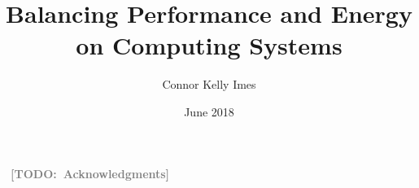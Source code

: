 \documentclass{ucetd}
\title{Balancing Performance and Energy on Computing Systems}
\author{Connor Kelly Imes}
\date{June 2018}
\newcommand{\TODO}[1]{\textcolor{gray}{\textbf{\ [TODO:\ #1]\ }}}
\begin{document}
\maketitle

\makecopyright
\makededication


\tableofcontents
\listoffigures
\listoftables

\acknowledgments
% 
\TODO{Acknowledgments}


\mainmatter







\end{document}
